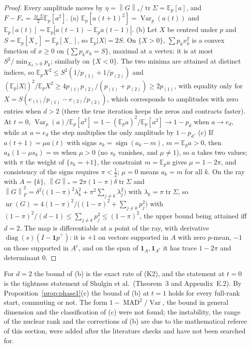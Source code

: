 \documentclass[11pt]{article}
\theoremstyle{definition}
\theoremstyle{remark}
\newcommand{\E}{\mathbb{E}}
\newcommand{\nnuc}[1]{\left\|#1\right\|_{*}}
\newcommand{\nF}[1]{\left\|#1\right\|_{F}}
\newcommand{\abs}[1]{\left|#1\right|}
\newcommand{\tr}{\operatorname{tr}}
\newcommand{\diag}{\operatorname{diag}}
\newcommand{\nr}{\operatorname{nr}}
\newcommand{\sign}{\operatorname{sign}}
\newcommand{\Var}{\operatorname{Var}}
\newcommand{\MAD}{\operatorname{MAD}}
\newcommand{\ones}{\mathbf{1}}
\begin{document}
\begin{proof}
Every amplitude moves by $\eta=\nnuc G/\tr\Sigma=\E_p[a]$, and $F-F_\ast=\frac{\tr\Sigma}2\E_p[a^2]$. (a)
$\E_p[a(t+1)^2]=\Var_p(a(t))$ and $\E_p[a(t)]=\E_p\abs{a(t-1)-\E_pa(t-1)}$. (b) Let $X$ be centred under $p$ and
$S=\E_p[X_+]=\E_p[X_-]$, so $\E_p\abs X=2S$. On $\{X>0\}$, $\sum p_kx_k^2$ is a convex function of $x\ge0$ on
$\{\sum p_kx_k=S\}$, maximal at a vertex: it is at most $S^2/\min_{X_k>0}p_k$; similarly on $\{X<0\}$. The two minima are
attained at distinct indices, so $\E_pX^2\le S^2(1/p_{(1)}+1/p_{(2)})$ and
$(\E_p\abs X)^2/\E_pX^2\ge4p_{(1)}p_{(2)}/(p_{(1)}+p_{(2)})\ge2p_{(1)}$, with equality only for
$X=S(e_{(1)}/p_{(1)}-e_{(2)}/p_{(2)})$, which corresponds to amplitudes with zero entries when $d>2$ (there the true
iteration keeps the zeros and contracts faster). At $t=0$, $\Var_p(a)/\E_p[a^2]=1-(\E_pa)^2/\E_p[a^2]\to1-p_d$ when
$a\to e_d$, while at $a=e_d$ the step multiplies the only amplitude by $1-p_d$. (c) If $a(t+1)=\mu a(t)$ with signs
$s_k=\sign(a_k-m)$, $m=\E_pa>0$, then $a_k(1-\mu s_k)=m$ when $\mu>0$ (no $s_k$ vanishes, and $\mu\ne1$), so $a$ takes two
values; with $\pi$ the weight of $\{s_k=+1\}$, the constraint $m=\E_pa$ gives $\mu=1-2\pi$, and consistency of the signs
requires $\pi<\frac12$; $\mu=0$ means $a_k=m$ for all $k$. On the ray with $A=\{k\}$,
$\nnuc G=2\pi(1-\pi)\delta\tr\Sigma$ and
$\nF G^2=\delta^2\big((1-\pi)^2\lambda_k^2+\pi^2\sum_{j\ne k}\lambda_j^2\big)$ with $\lambda_k=\pi\tr\Sigma$, so
$\nr(G)=4(1-\pi)^2/\big((1-\pi)^2+\sum_{j\ne k}p_j^2\big)$ with
$(1-\pi)^2/(d-1)\le\sum_{j\ne k}p_j^2\le(1-\pi)^2$, the upper bound being attained iff $d=2$. The map is differentiable
at a point of the ray, with derivative $\diag(s)(I-\ones p^\top)$: it is $+1$ on vectors supported in $A$ with zero
$p$-mean, $-1$ on those supported in $A^c$, and on the span of $\ones_A,\ones_{A^c}$ it has trace $1-2\pi$ and
determinant $0$.
\end{proof}

For $d=2$ the bound of (b) is the exact rate of (K2), and the statement at $t=0$ is the tightness statement of Shulgin
et al.\ (Theorem~3 and Appendix~E.2). By Proposition~\ref{prop:phase1}(c) the bound of (b) at $t=1$ holds for every
full-rank start, commuting or not. The form $1-\MAD^2/\Var$, the bound in general dimension and the classification of
(c) were not found; the instability, the range of the nuclear rank and the corrections of (b) are due to the
mathematical referee of this section, were added after the literature checks and have not been searched for.
\end{document}
